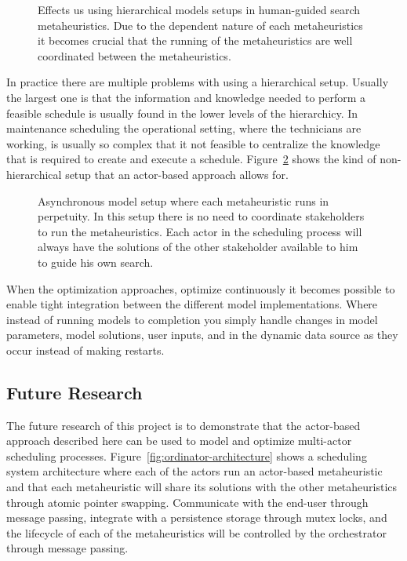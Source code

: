 \begin{figure}[H]
	
	\label{fig:discussion:hierarchical_model_setup}
	\caption{Effects us using hierarchical models setups in human-guided search metaheuristics.
	Due to the dependent nature of each metaheuristics it becomes crucial that the running of 
	the metaheuristics are well coordinated between the metaheuristics.}
\end{figure}

In practice there are multiple problems with using a hierarchical setup.
Usually the largest one is that the information and knowledge needed to 
perform a feasible schedule is usually found in the lower levels of the 
hierarchicy. In maintenance scheduling the operational setting, where the
technicians are working, is usually so complex that it not feasible to 
centralize the knowledge that is required to create and execute a 
schedule. Figure~\ref{fig:discussion:asynchronous_setup}
shows the kind of non-hierarchical setup that an actor-based approach 
allows for.

\begin{figure}[H]
	
	\caption{Asynchronous model setup where each metaheuristic runs in perpetuity. In this setup
	there is no need to coordinate stakeholders to run the metaheuristics. Each actor in the 
	scheduling process will always have the solutions of the other stakeholder available to 
	him to guide his own search.}
	\label{fig:discussion:asynchronous_setup}
\end{figure}

When the optimization approaches, optimize continuously it becomes possible
to enable tight integration between the different model implementations. Where 
instead of running models to completion you simply handle changes in model 
parameters, model solutions, user inputs, and in the dynamic data source as 
they occur instead of making restarts.

\subsection{Future Research}
\label{sec:discussion:future_research}
The future research of this project is to demonstrate that
the actor-based approach described here can be used to model and optimize 
multi-actor scheduling processes. 
Figure~\ref{fig:ordinator-architecture}
shows a scheduling system architecture where each of the actors run an actor-based metaheuristic
and that each metaheuristic will share its solutions with the other
metaheuristics through atomic pointer swapping. Communicate with the end-user
through message passing, integrate with a persistence storage through mutex
locks, and the lifecycle of each of the metaheuristics will be controlled by
the orchestrator through message passing. 

